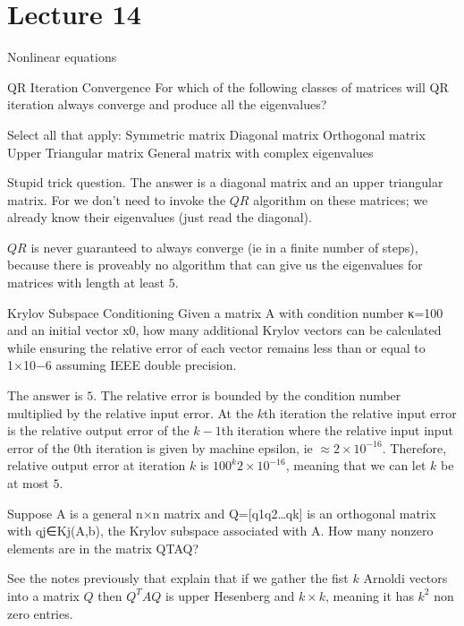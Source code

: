 \documentclass[../main.tex]{subfiles}
\begin{document}
\section{Lecture 14}{Nonlinear equations}
\begin{problem}
    QR Iteration Convergence
For which of the following classes of matrices will QR iteration always converge and produce all the eigenvalues?

Select all that apply:
Symmetric matrix
Diagonal matrix
Orthogonal matrix
Upper Triangular matrix
General matrix with complex eigenvalues
\end{problem}

\begin{solution}
    Stupid trick question. The answer is a diagonal matrix and an upper triangular matrix. For we don't need to invoke the $QR$ algorithm on these matrices; we already know their eigenvalues (just read the diagonal).
    
    $QR$ is never guaranteed to always converge (ie in a finite number of steps), because there is proveably no algorithm that can give us the eigenvalues for matrices with length at least $5$. 
\end{solution}

\begin{problem}
    Krylov Subspace Conditioning
Given a matrix A with condition number κ=100 and an initial vector x0, how many additional Krylov vectors can be calculated while ensuring the relative error of each vector remains less than or equal to 1×10−6 assuming IEEE double precision.
\end{problem}
\begin{solution}
    The answer is $5$. The relative error is bounded by the condition number multiplied by the relative input error. At the $k$th iteration the relative input error is the relative output error of the $k-1$th iteration where the relative input input error of the $0$th iteration is given by machine epsilon, ie $\approx 2 \times 10^{-16}$. Therefore, relative output error at iteration $k$ is $100^k 2 \times 10^{-16}$, meaning that we can let $k$ be at most $5$.
\end{solution}

\begin{problem}
     Suppose A is a general n×n matrix and Q=[q1q2…qk] is an orthogonal matrix with qj∈Kj(A,b), the Krylov subspace associated with A. How many nonzero elements are in the matrix QTAQ?
\end{problem}
\begin{solution}
    See the notes previously that explain that if we gather the fist $k$ Arnoldi vectors into a matrix $Q$ then $Q^T A Q$ is upper Hesenberg and $k \times k$, meaning it has $k^2$ non zero entries. 
\end{solution}
\end{document}
